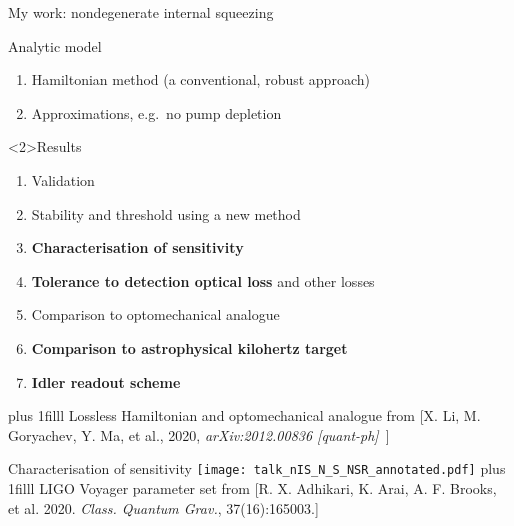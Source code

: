 \documentclass[12pt,xcolor=dvipsnames]{beamer}
\newcommand{\vframefill}{\vskip0pt plus 1filll}
\begin{document}
\begin{frame}{My work: nondegenerate internal squeezing} 
\begin{block}{Analytic model}
\begin{enumerate}
\item Hamiltonian method (a conventional, robust approach) %
\item Approximations, e.g.\ no pump depletion %
\end{enumerate}
\end{block}

\begin{block}<2>{Results} %
\begin{enumerate}
\item Validation %
\item Stability and threshold using a new method %
\item \textbf{Characterisation of sensitivity}
\item \textbf{Tolerance to detection optical loss} and other losses
\item Comparison to optomechanical analogue
\item \textbf{Comparison to astrophysical kilohertz target}
\item \textbf{Idler readout scheme} %
\end{enumerate}
\end{block}
\vframefill\centering
{\fontsize{5.9}{10}\selectfont\vspace{-0.1cm}Lossless Hamiltonian and optomechanical analogue from [X. Li, M. Goryachev, Y. Ma, et al., 2020, \emph{arXiv:2012.00836 [quant-ph]}\ ]} 
\end{frame}

\begin{frame}{Characterisation of sensitivity}
\centering
\vspace*{1cm}
\texttt{[image: talk\_nIS\_N\_S\_NSR\_annotated.pdf]} %
\vframefill\centering
{\tiny LIGO Voyager parameter set from [R. X. Adhikari, K. Arai, A. F. Brooks, et al. 2020. \emph{Class. Quantum Grav.}, 37(16):165003.]}
\end{frame}
\end{document}
